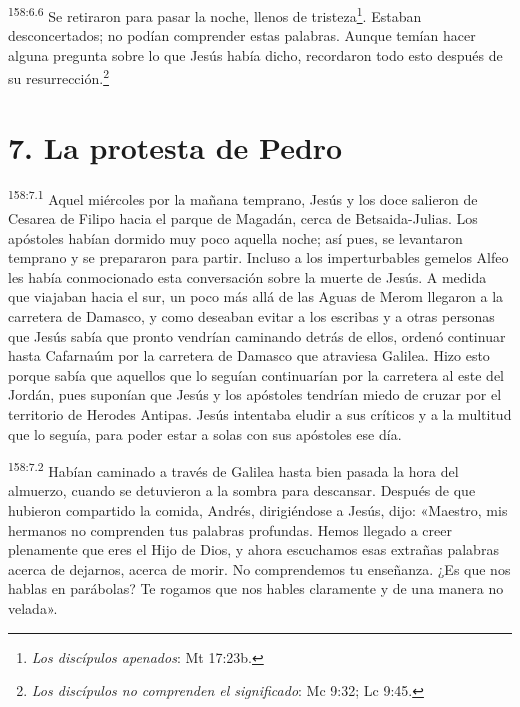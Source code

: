 \par
\textsuperscript{158:6.6} Se retiraron para pasar la noche, llenos de tristeza\footnote{\textit{Los discípulos apenados}: Mt 17:23b.}. Estaban desconcertados; no podían comprender estas palabras. Aunque temían hacer alguna pregunta sobre lo que Jesús había dicho, recordaron todo esto después de su resurrección.\footnote{\textit{Los discípulos no comprenden el significado}: Mc 9:32; Lc 9:45.}

\section*{7. La protesta de Pedro}
\par
\textsuperscript{158:7.1} Aquel miércoles por la mañana temprano, Jesús y los doce salieron de Cesarea de Filipo hacia el parque de Magadán, cerca de Betsaida-Julias. Los apóstoles habían dormido muy poco aquella noche; así pues, se levantaron temprano y se prepararon para partir. Incluso a los imperturbables gemelos Alfeo les había conmocionado esta conversación sobre la muerte de Jesús. A medida que viajaban hacia el sur, un poco más allá de las Aguas de Merom llegaron a la carretera de Damasco, y como deseaban evitar a los escribas y a otras personas que Jesús sabía que pronto vendrían caminando detrás de ellos, ordenó continuar hasta Cafarnaúm por la carretera de Damasco que atraviesa Galilea. Hizo esto porque sabía que aquellos que lo seguían continuarían por la carretera al este del Jordán, pues suponían que Jesús y los apóstoles tendrían miedo de cruzar por el territorio de Herodes Antipas. Jesús intentaba eludir a sus críticos y a la multitud que lo seguía, para poder estar a solas con sus apóstoles ese día.

\par
\textsuperscript{158:7.2} Habían caminado a través de Galilea hasta bien pasada la hora del almuerzo, cuando se detuvieron a la sombra para descansar. Después de que hubieron compartido la comida, Andrés, dirigiéndose a Jesús, dijo: «Maestro, mis hermanos no comprenden tus palabras profundas. Hemos llegado a creer plenamente que eres el Hijo de Dios, y ahora escuchamos esas extrañas palabras acerca de dejarnos, acerca de morir. No comprendemos tu enseñanza. ¿Es que nos hablas en parábolas? Te rogamos que nos hables claramente y de una manera no velada».

